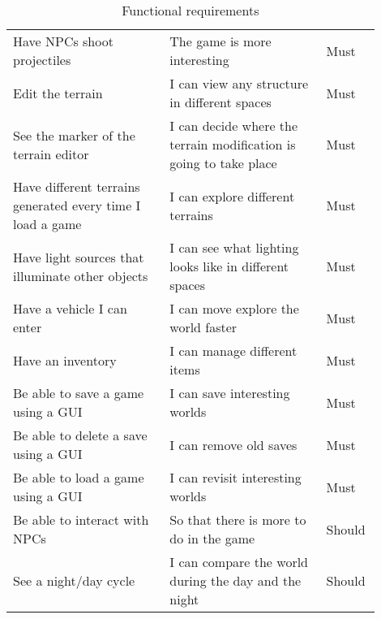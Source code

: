 \begin{table}[h]
\begin{tabular}{|p{0.4\linewidth}|p{0.4\linewidth}|p{0.1\linewidth}|}
        Have NPCs shoot projectiles                                & The game is more interesting                                       & Must           \\
        Edit the terrain                                           & I can view any structure in different spaces                       & Must           \\
        See the marker of the terrain editor                       & I can decide where the terrain modification is going to take place & Must           \\
        Have different terrains generated every time I load a game & I can explore different terrains                                   & Must           \\
        Have light sources that illuminate other objects           & I can see what lighting looks like in different spaces             & Must           \\
        Have a vehicle I can enter                                 & I can move explore the world faster                                & Must           \\
        Have an inventory                                          & I can manage different items                                       & Must           \\
        Be able to save a game using a GUI                         & I can save interesting worlds                                      & Must           \\
        Be able to delete a save using a GUI                       & I can remove old saves                                             & Must           \\
        Be able to load a game using a GUI                         & I can revisit interesting worlds                                   & Must           \\
        Be able to interact with NPCs                              & So that there is more to do in the game                            & Should         \\
        See a night/day cycle                                      & I can compare the world during the day and the night               & Should         \\
        \hline
    \end{tabular}
    \caption{Functional requirements}
    \label{tab:functional_requirements}
\end{table}
